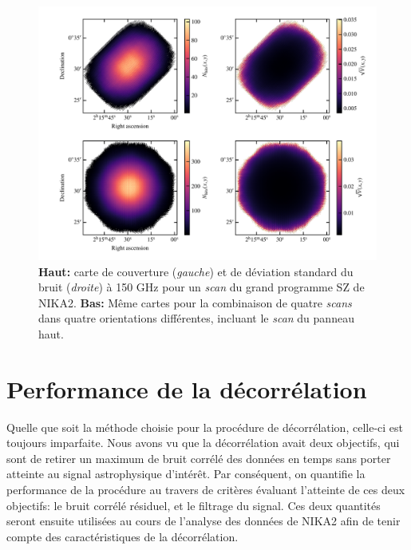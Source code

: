 \begin{figure}[t]
    \centering
    \includegraphics[width=\linewidth]{Figures/Chap_decor/scans.pdf}
    \caption{
        \textbf{Haut:} carte de couverture (\textit{gauche}) et de déviation standard du bruit (\textit{droite}) à 150 GHz pour un \textit{scan} du grand programme SZ de NIKA2.
        \textbf{Bas:} Même cartes pour la combinaison de quatre \textit{scans} dans quatre orientations différentes, incluant le \textit{scan} du panneau haut.
    }
    \label{fig:nhits_std_maps}
\end{figure}

\section{Performance de la décorrélation}\label{sec:perf_decor}

Quelle que soit la méthode choisie pour la procédure de décorrélation, celle-ci est toujours imparfaite.
Nous avons vu que la décorrélation avait deux objectifs, qui sont de retirer un maximum de bruit corrélé des données en temps sans porter atteinte au signal astrophysique d'intérêt.
Par conséquent, on quantifie la performance de la procédure au travers de critères évaluant l'atteinte de ces deux objectifs: le bruit corrélé résiduel, et le filtrage du signal.
Ces deux quantités seront ensuite utilisées au cours de l'analyse des données de NIKA2 afin de tenir compte des caractéristiques de la décorrélation.

